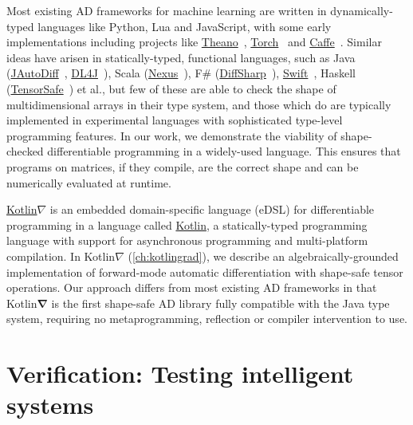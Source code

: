 \documentclass[12pt,initial,twoside,maitrise]{dms}
\numberwithin{equation}{section}
\numberwithin{table}{chapter}
\numberwithin{figure}{chapter}
\begin{document}
Most existing AD frameworks for machine learning are written in dynamically-typed languages like Python, Lua and JavaScript, with some early implementations including projects like \href{http://deeplearning.net/software/theano/}{Theano}~\citep{bergstra2010theano}, \href{http://torch.ch/}{Torch}~\citep{collobert2002torch} and \href{https://caffe.berkeleyvision.org/}{Caffe}~\citep{jia2014caffe}. Similar ideas have arisen in statically-typed, functional languages, such as Java (\href{https://github.com/uniker9/JAutoDiff}{JAutoDiff}~\citep{nureki2012jautodiff}, \href{https://deeplearning4j.org/}{DL4J}~\cite{team2016dl4j}), Scala (\href{https://tongfei.me/nexus/}{Nexus}~\citep{chen2017typesafe}), F\# (\href{http://diffsharp.github.io/DiffSharp/}{DiffSharp}~\citep{baydin2015diffsharp}), \href{https://www.tensorflow.org/swift}{Swift}~\citep{lattner2018tensorflow}, Haskell (\href{https://github.com/leopiney/tensor-safe}{TensorSafe}~\citep{pineyro2019structure}) et al., but few of these are able to check the shape of multidimensional arrays in their type system, and those which do are typically implemented in experimental languages with sophisticated type-level programming features. In our work, we demonstrate the viability of shape-checked differentiable programming in a widely-used language. This ensures that programs on matrices, if they compile, are the correct shape and can be numerically evaluated at runtime.

\href{https://github.com/breandan/kotlingrad/}{Kotlin$\nabla$} is an embedded domain-specific language (eDSL) for differentiable programming in a language called \href{https://kotlinlang.org}{Kotlin}, a statically-typed programming language with support for asynchronous programming and multi-platform compilation. In Kotlin$\nabla$ (\autoref{ch:kotlingrad}), we describe an algebraically-grounded implementation of forward-mode automatic differentiation with shape-safe tensor operations. Our approach differs from most existing AD frameworks in that Kotlin$\mathbf{\nabla}$ is the first shape-safe AD library fully compatible with the Java type system, requiring no metaprogramming, reflection or compiler intervention to use.

\section{Verification: Testing intelligent systems}
\end{document}
